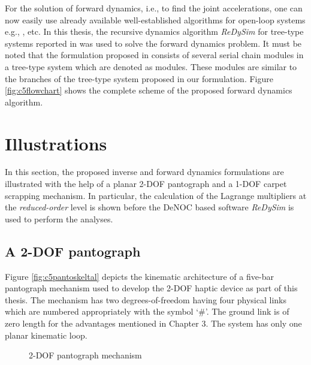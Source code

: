 {For the solution of forward dynamics, i.e., to find the joint accelerations, one can now easily use already available well-established algorithms for open-loop systems e.g., \citet{hollerbach1980recursive,walker1982efficient,shah2013dynamics}, etc. In this thesis, the recursive dynamics algorithm \emph{ReDySim} for tree-type systems reported in \citet{shah2013dynamics} was used to solve the forward dynamics problem. It must be noted that the formulation proposed in \citet{shah2013dynamics} consists of several serial chain modules in a tree-type system which are denoted as modules. These modules are similar to the branches of the tree-type system proposed in our formulation. Figure \ref{fig:c5flowchart} shows the complete scheme of the proposed forward dynamics algorithm.
\section{Illustrations}
\label{c5examples}
In this section, the proposed inverse and forward dynamics formulations are illustrated with the help of a planar 2-DOF pantograph and a 1-DOF carpet scrapping mechanism. In particular, the calculation of the Lagrange multipliers at the \emph{reduced-order} level is shown before the DeNOC based software \textit{ReDySim} is used to perform the analyses.
\subsection{A 2-DOF pantograph}
\label{c52dofmech}
Figure \ref{fig:c5pantoskeltal} depicts the kinematic architecture of a five-bar pantograph mechanism used to develop the 2-DOF haptic device as part of this thesis. The mechanism has two degrees-of-freedom having four physical links which are numbered appropriately with the symbol `\#'. The ground link is of zero length for the advantages mentioned in Chapter 3. The system has only one planar kinematic loop. 
\begin{figure}[b!]
	\begin{center}
		\caption{2-DOF pantograph mechanism}
		\label{fig:c5pantograph}
	\end{center} 
\end{figure}

}
